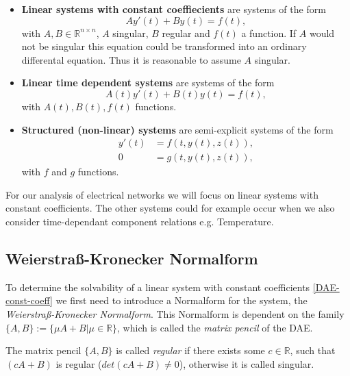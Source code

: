 	\begin{itemize}
		\item \textbf{Linear systems with constant coeffiecients} \newline
		are systems of the form 
		\begin{equation}
			\label{DAE-const-coeff}
			A y'(t) + B y(t) = f(t) ,
		\end{equation}
		with $A,B \in \mathbb{R}^{n \times n}$, $A$ singular, $B$ regular and $f(t)$ a function. If $A$ would not be singular this equation could be transformed into an ordinary differental equation. Thus it is reasonable to assume $A$ singular.
		
		\item \textbf{Linear time dependent systems}
		are systems of the form
		\begin{displaymath}
			A(t) y'(t) + B(t) y(t) = f(t) ,
		\end{displaymath}
		with $A(t),B(t),f(t)$ functions.
		
		\item  \textbf{Structured (non-linear) systems} \newline
		are semi-explicit systems of the form
		\begin{align}
			y'(t) &= f(t, y(t), z(t)) , \\
			0 &= g(t,y(t),z(t)) ,
		\end{align}
		with $f$ and $g$ functions.
	\end{itemize}
	
	For our analysis of electrical networks we will focus on linear systems with constant coefficients. The other systems could for example occur when we also consider time-dependant component relations e.g. Temperature.

\subsection{Weierstraß-Kronecker Normalform}
\label{chap:Weierstraß-Kronecker Normalform}

To determine the solvability of a linear system with constant coefficients \eqref{DAE-const-coeff} we first need to introduce a Normalform for the system, the \emph{Weierstraß-Kronecker Normalform}. This Normalform is dependent on the family $\{A,B\} := \{ \mu A+B|\mu \in \mathbb{R} \}$, which is called the  \emph{matrix pencil} of the DAE.

\begin{definition}
	The matrix pencil $\{ A,B\}$ is called \emph{regular} if there exists some $c \in \mathbb{R}$, such that $(cA+B)$ is regular ($det(cA+B) \neq 0$), otherwise it is called singular.
\end{definition}

